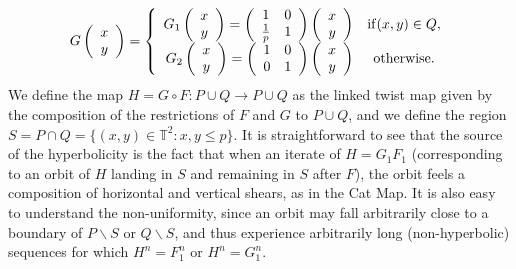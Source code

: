 \documentclass{iopart}
\begin{document}
\begin{equation}
\label{ltmboundsG}
G \left( \begin{array}{c} x\\ y \end{array} \right) = \left\{
\begin{array}{r@{\quad}cr}
G_1 \left( \begin{array}{c} x\\ y \end{array} \right)= \left( \begin{array}{cc} 1 & 0 \\ \frac{1}{p} & 1 \end{array} \right) \left( \begin{array}{c} x\\ y \end{array} \right) & \mathrm{ if } (x,y) \in Q,\\
G_2 \left( \begin{array}{c} x\\ y \end{array} \right)= \left( \begin{array}{cc} 1 & 0 \\ 0 & 1 \end{array} \right) \left( \begin{array}{c} x\\ y \end{array} \right) & \mathrm{ otherwise}.
\end{array}\right.
\end{equation}
We define the map $H = G \circ F: P \cup Q \rightarrow P \cup Q$ as the linked twist map given by the composition of the restrictions of $F$ and $G$ to $P \cup Q$, and we define the region $S = P \cap Q = \{(x,y) \in \mathbb{T}^2 : x,y \le p\}$. It is straightforward to see that the source of the hyperbolicity is the fact that when an iterate of $H = G_1 F_1$ (corresponding to an orbit of $H$ landing in $S$ and remaining in $S$ after $F$), the orbit feels a composition of horizontal and vertical shears, as in the Cat Map. It is also easy to understand the non-uniformity, since an orbit may fall arbitrarily close to a boundary of $P\backslash S$ or $Q\backslash S$, and thus experience arbitrarily long (non-hyperbolic) sequences for which $H^n=F_1^n$ or $H^n=G_1^n$. 
\end{document}

